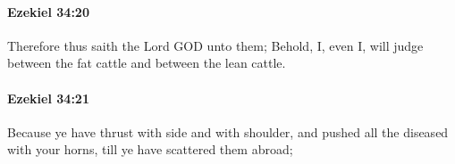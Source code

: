 		\paragraph{Ezekiel 34:20} %
			\label{EZEKIEL-34-20}

			Therefore thus saith the Lord GOD unto them; Behold, I, even I, will judge between the fat cattle and between the lean cattle.


		\paragraph{Ezekiel 34:21} %
			\label{EZEKIEL-34-21}

			Because ye have thrust with side and with shoulder, and pushed all the diseased with your horns, till ye have scattered them abroad;


